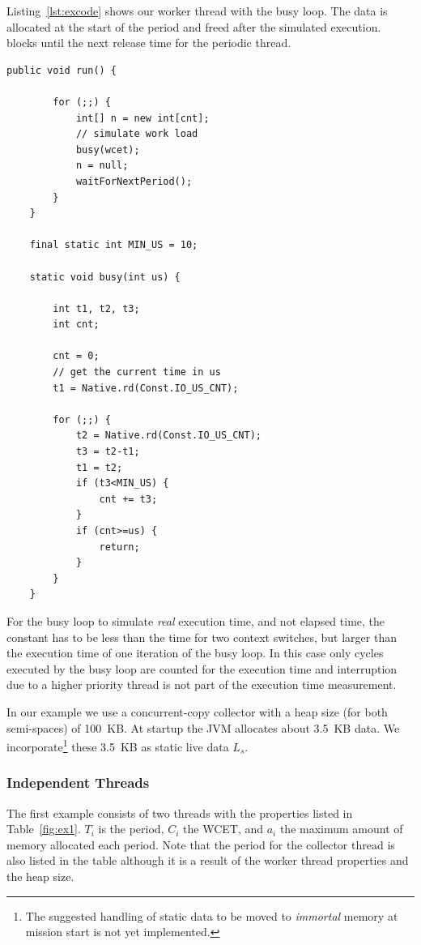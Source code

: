 Listing~\ref{lst:excode} shows our worker thread with the busy loop.
The data is allocated at the start of the period and freed after the
simulated execution.  blocks until the next
release time for the periodic thread.

\begin{lstlisting}[float, caption={Example periodic thread with a busy loop},
label=lst:excode]
    public void run() {

        for (;;) {
            int[] n = new int[cnt];
            // simulate work load
            busy(wcet);
            n = null;
            waitForNextPeriod();
        }
    }

    final static int MIN_US = 10;

    static void busy(int us) {

        int t1, t2, t3;
        int cnt;

        cnt = 0;
        // get the current time in us
        t1 = Native.rd(Const.IO_US_CNT);

        for (;;) {
            t2 = Native.rd(Const.IO_US_CNT);
            t3 = t2-t1;
            t1 = t2;
            if (t3<MIN_US) {
                cnt += t3;
            }
            if (cnt>=us) {
                return;
            }
        }
    }
\end{lstlisting}

For the busy loop to simulate \emph{real} execution time, and not
elapsed time, the constant  has to be less than the
time for two context switches, but larger than the execution time of
one iteration of the busy loop. In this case only cycles executed by
the busy loop are counted for the execution time and interruption
due to a higher priority thread is not part of the execution time
measurement.

In our example we use a concurrent-copy collector with a heap size
(for both semi-spaces) of 100~KB. At startup the JVM allocates about
3.5~KB data. We incorporate\footnote{The suggested handling of static
data to be moved to \emph{immortal} memory at mission start is not
yet implemented.} these 3.5~KB as static live data $L_s$.



\subsubsection{Independent Threads}

The first example consists of two threads with the properties listed
in Table~\ref{fig:ex1}. $T_i$ is the period, $C_i$ the WCET, and
$a_i$ the maximum amount of memory allocated each period. Note that
the period for the collector thread is also listed in the table
although it is a result of the worker thread properties and the heap
size.

